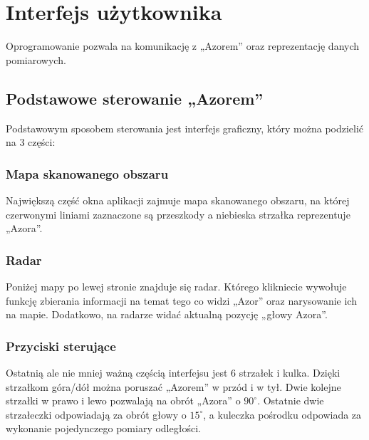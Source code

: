 \section{Interfejs użytkownika}
    \tab Oprogramowanie pozwala na komunikację z „Azorem” oraz reprezentację danych pomiarowych.

    

    \subsection{Podstawowe sterowanie „Azorem”}
        \tab Podstawowym sposobem sterowania jest interfejs graficzny, który można podzielić na 3 części:

        \subsubsection{Mapa skanowanego obszaru}        
            \tab Największą część okna aplikacji zajmuje mapa skanowanego obszaru, 
            na której czerwonymi liniami zaznaczone są przeszkody a niebieska strzałka reprezentuje „Azora”.

        \subsubsection{Radar}
            \tab Poniżej mapy po lewej stronie znajduje się radar. 
            Którego klikniecie wywołuje funkcję zbierania informacji na temat tego co widzi „Azor” oraz narysowanie ich na mapie. 
            Dodatkowo, na radarze widać aktualną pozycję „głowy Azora”.
        
        \subsubsection{Przyciski sterujące}
            \tab Ostatnią ale nie mniej ważną częścią interfejsu jest 6 strzałek i kulka. 
            Dzięki strzałkom góra/dół można poruszać „Azorem” w przód i w tył.
            Dwie kolejne strzałki w prawo i lewo pozwalają na obrót „Azora” o $90^\circ$.
            Ostatnie dwie strzałeczki odpowiadają za obrót głowy o $15^\circ$, a kuleczka pośrodku odpowiada za wykonanie pojedynczego pomiary odległości.


